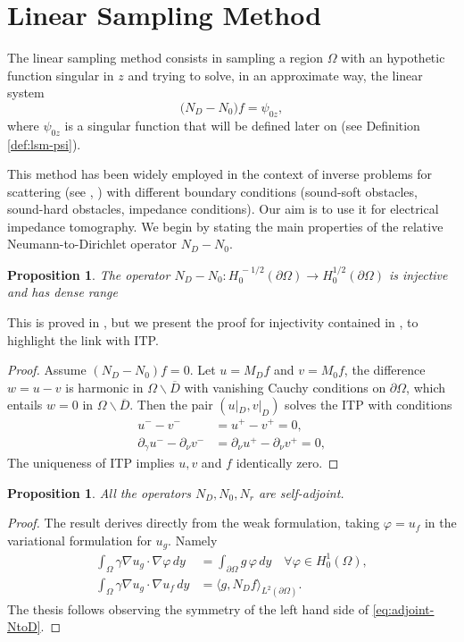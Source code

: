 \documentclass[10pt, a4paper, twoside, openright]{book}
\theoremstyle{definition}
\theoremstyle{plain}
\theoremstyle{plain}
\theoremstyle{plain}
\newtheorem{proposition}[subsection]{Proposition}
\theoremstyle{plain}
\theoremstyle{plain}
\theoremstyle{plain}
\theoremstyle{plain}
\theoremstyle{plain}
\let\phi\varphi
\begin{document}
\section{Linear Sampling Method}
 The linear sampling method consists in sampling a region $\Omega$ with an hypothetic function 
 singular in $z$ and trying to solve, in an approximate way, the linear system
 \begin{equation}
 \label{eq:lsm-approximate-lin-eq}
  \bigl({N_D} - {N_0}\bigr)f=\psi_{0z},
 \end{equation}
 where $\psi_{0z}$ is a singular function that will be defined later on (see Definition \ref{def:lsm-psi}).
 \par
 This method has been widely employed in the context of inverse problems for scattering (see \cite{colton-haddar-piana:lsm}, \cite{cakoni-colton-haddar:lsm}) with different boundary conditions (sound-soft obstacles, sound-hard obstacles, impedance conditions). Our aim is to use it for electrical impedance tomography.
 We begin by stating the main properties of the relative Neumann-to-Dirichlet operator ${N_D} - {N_0}$.
 \begin{proposition}
  The operator ${N_D} - {N_0}:H_0^{\,-1/2}(\partial \Omega)\to H_0^{1/2}(\partial \Omega)$ is injective and has dense range
 \end{proposition}
 This is proved in \cite{kirsch:book}, but we present the proof for injectivity contained in \cite{somersalo:preprint}, to highlight the link with ITP.
 \begin{proof}
 Assume $({N_D} - {N_0})f = 0$. Let $u=M_Df$ and $v=M_0f$, the difference $w=u-v$ is harmonic in $\Omega\backslash\overline{D}$ with vanishing Cauchy conditions on $\partial \Omega$, which entails $w=0$ in $\Omega\backslash\overline{D}$. Then the pair $(u|_D,v|_D)$ solves the ITP with conditions
 \begin{align}
  u^--v^- &=u^+ - v^+ = 0 ,\\
  \partial_\gamma u^- - \partial_\nu v^- &= \partial_\nu u^+ - \partial_\nu v^+ = 0 ,
 \end{align}
The uniqueness of ITP implies $u,v$ and $f$ identically zero. 
 \end{proof}
\begin{proposition}
  All the operators ${N_D}, {N_0}, {N_r}$ are self-adjoint.
 \end{proposition}
 \begin{proof}
 The result derives directly from the weak formulation, taking $\phi=u_f$ in the variational formulation for $u_g$. Namely
 \begin{align}
  \int_{\Omega}\gamma\nabla u_g \cdot \nabla \phi\,dy &= \int_{\partial\Omega}g\,\phi\,dy \quad \forall \phi\in H^1_0(\Omega) ,\\
  \int_{\Omega}\gamma\nabla u_g \cdot \nabla u_f\,dy &= \langle g, {N_D} f\rangle_{L^2(\partial \Omega)} \label{eq:adjoint-NtoD}.
 \end{align}
The thesis follows observing the symmetry of the left hand side of \eqref{eq:adjoint-NtoD}.
 \end{proof}
\end{document}
